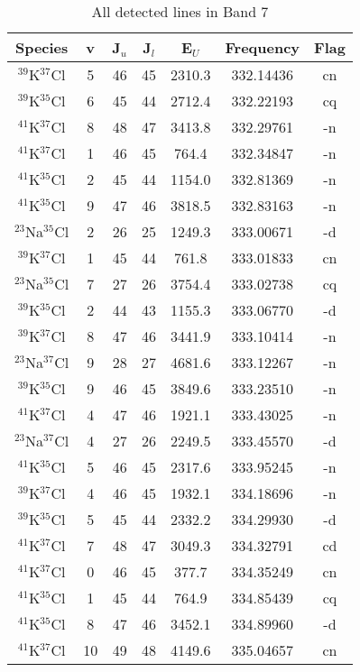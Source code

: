 \begin{table*}[htp]
\centering
\caption{All detected lines in Band 7}
\begin{tabular}{ccccccc}
\label{tab:all_detections_B7}
Species & v & J$_u$ & J$_l$ & E$_U$ & Frequency & Flag \\
\hline
$^{39}$K$^{37}$Cl & 5 & 46 & 45 & 2310.3 & 332.14436 & cn \\
$^{39}$K$^{35}$Cl & 6 & 45 & 44 & 2712.4 & 332.22193 & cq \\
$^{41}$K$^{37}$Cl & 8 & 48 & 47 & 3413.8 & 332.29761 & -n \\
$^{41}$K$^{37}$Cl & 1 & 46 & 45 & 764.4 & 332.34847 & -n \\
$^{41}$K$^{35}$Cl & 2 & 45 & 44 & 1154.0 & 332.81369 & -n \\
$^{41}$K$^{35}$Cl & 9 & 47 & 46 & 3818.5 & 332.83163 & -n \\
$^{23}$Na$^{35}$Cl & 2 & 26 & 25 & 1249.3 & 333.00671 & -d \\
$^{39}$K$^{37}$Cl & 1 & 45 & 44 & 761.8 & 333.01833 & cn \\
$^{23}$Na$^{35}$Cl & 7 & 27 & 26 & 3754.4 & 333.02738 & cq \\
$^{39}$K$^{35}$Cl & 2 & 44 & 43 & 1155.3 & 333.06770 & -d \\
$^{39}$K$^{37}$Cl & 8 & 47 & 46 & 3441.9 & 333.10414 & -n \\
$^{23}$Na$^{37}$Cl & 9 & 28 & 27 & 4681.6 & 333.12267 & -n \\
$^{39}$K$^{35}$Cl & 9 & 46 & 45 & 3849.6 & 333.23510 & -n \\
$^{41}$K$^{37}$Cl & 4 & 47 & 46 & 1921.1 & 333.43025 & -n \\
$^{23}$Na$^{37}$Cl & 4 & 27 & 26 & 2249.5 & 333.45570 & -d \\
$^{41}$K$^{35}$Cl & 5 & 46 & 45 & 2317.6 & 333.95245 & -n \\
$^{39}$K$^{37}$Cl & 4 & 46 & 45 & 1932.1 & 334.18696 & -n \\
$^{39}$K$^{35}$Cl & 5 & 45 & 44 & 2332.2 & 334.29930 & -d \\
$^{41}$K$^{37}$Cl & 7 & 48 & 47 & 3049.3 & 334.32791 & cd \\
$^{41}$K$^{37}$Cl & 0 & 46 & 45 & 377.7 & 334.35249 & cn \\
$^{41}$K$^{35}$Cl & 1 & 45 & 44 & 764.9 & 334.85439 & cq \\
$^{41}$K$^{35}$Cl & 8 & 47 & 46 & 3452.1 & 334.89960 & -d \\
$^{41}$K$^{37}$Cl & 10 & 49 & 48 & 4149.6 & 335.04657 & cn \\

\end{tabular}
\end{table*}
